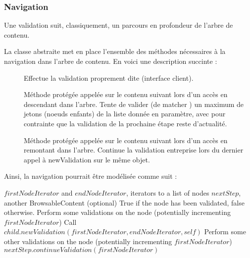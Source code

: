 \subsubsection{Navigation}
Une validation suit, classiquement, un parcours en profondeur de l'arbre de contenu.

La classe abstraite  met en place l'ensemble des méthodes nécessaires à la navigation dans l'arbre de contenu.
En voici une description succinte :
\begin{description}
\item[] Effectue la validation proprement dite (interface client).
\item[] Méthode protégée appelée sur le contenu suivant lors d'un accès en \og descendant \fg dans l'arbre. Tente de valider (de \og matcher \fg) un maximum de jetons (noeuds enfants) de la liste donnée en paramètre, avec pour contrainte que la validation de la prochaine étape reste d'actualité.
\item[] Méthode protégée appelée sur le contenu suivant lors d'un accès en \og remontant \fg dans l'arbre. Continue la validation entreprise lors du dernier appel à newValidation sur le même objet.
\end{description}

Ainsi, la navigation pourrait être modélisée comme suit :
\begin{algorithm}[H]
\caption{}
\begin{algorithmic}
\REQUIRE $firstNodeIterator$ and $endNodeIterator$, iterators to a list of nodes
\REQUIRE $nextStep$, another BrowsableContent (optional)
\ENSURE True if the node has been validated, false otherwise.
\STATE Perform some validations on the node (potentially incrementing $firstNodeIterator$)
\STATE Call $child.newValidation(firstNodeIterator, endNodeIterator, self)$
\ENDFOR
\STATE Perform some other validations on the node (potentially incrementing $firstNodeIterator$)
\RETURN $nextStep.continueValidation(firstNodeIterator)$
\ELSE
{}
\RETURN \TRUE
\ELSE
\RETURN \FALSE
\ENDIF
\ENDIF
\ELSE
\RETURN \FALSE
\ENDIF
\end{algorithmic}
\end{algorithm}

